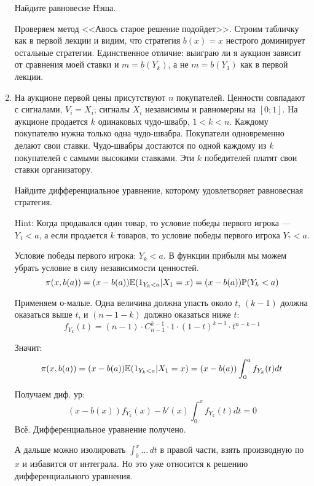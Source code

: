 \begin{enumerate}
Найдите равновесие Нэша.

Проверяем метод <<Авось старое решение подойдет>>. Строим табличку как в первой лекции и видим, что стратегия $ b(x)=x $ нестрого доминирует остальные стратегии. Единственное отличие: выиграю ли я аукцион зависит от сравнения моей ставки и  $m=b(Y_{k}) $, а не $m=b(Y_{1}) $ как в первой лекции.


\item На аукционе первой цены присутствуют $ n $ покупателей. Ценности совпадают с сигналами, $ V_{i}=X_{i} $; сигналы $ X_{i} $ независимы и равномерны на $ [0;1] $. На аукционе продается $k$ одинаковых чудо-швабр, $ 1<k<n $. Каждому покупателю нужна только одна чудо-швабра. Покупатели одновременно делают свои ставки. Чудо-швабры достаются по одной каждому из $ k $ покупателей с самыми высокими ставками. Эти $ k $ победителей платят свои ставки организатору.

Найдите дифференциальное уравнение, которому удовлетворяет равновесная стратегия.

Hint: Когда продавался один товар, то условие победы первого игрока --- $ Y_{1}<a $, а если продается $ k $ товаров, то условие победы первого игрока $ Y_{?}<a $.

Условие победы первого игрока: $ Y_{k}<a $. В функции прибыли мы можем убрать условие в силу независимости ценностей.
\begin{equation}
\pi(x,b(a))=(x-b(a))\mathbb{E}(1_{Y_{k}<a}|X_{1}=x)=(x-b(a))\mathbb{P}(Y_{k}<a)
\end{equation}

Применяем о-малые. Одна величина должна упасть около $ t $, $ (k-1) $ должна оказаться выше $ t $, и $ (n-1-k) $ должно оказаться ниже $ t $:
\begin{equation}
f_{Y_{k}}(t)=(n-1)\cdot C_{n-1}^{k-1}\cdot 1\cdot (1-t)^{k-1}\cdot t^{n-k-1}
\end{equation}

Значит:
\begin{equation}
\pi(x,b(a))=(x-b(a))\mathbb{E}(1_{Y_{k}<a}|X_{1}=x)=(x-b(a))\int_{0}^{a}f_{Y_{k}}(t)dt
\end{equation}

Получаем диф. ур:
\begin{equation}
(x-b(x))f_{Y_{k}}(x)-b'(x)\int_{0}^{x}f_{Y_{k}}(t)dt=0
\end{equation}
Всё. Дифференциальное уравнение получено. 

А дальше можно изолировать $ \int_{0}^{x}\ldots\, dt $ в правой части, взять производную по $ x $ и избавится от интеграла. Но это уже относится к решению дифференциального уравнения.



\end{enumerate}
